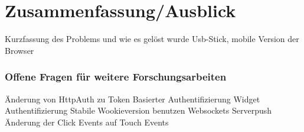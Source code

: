 \chapter{Zusammenfassung/Ausblick} 
\label{Kapitel 7}
Kurzfassung des Problems und wie es gelöst wurde
Usb-Stick, mobile Version der Browser


\subsection{Offene Fragen für weitere Forschungsarbeiten}
Änderung von HttpAuth zu Token Basierter Authentifizierung
Widget Authentifizierung
Stabile Wookieversion benutzen
Websockets
Serverpush
Änderung der Click Events auf Touch Events



